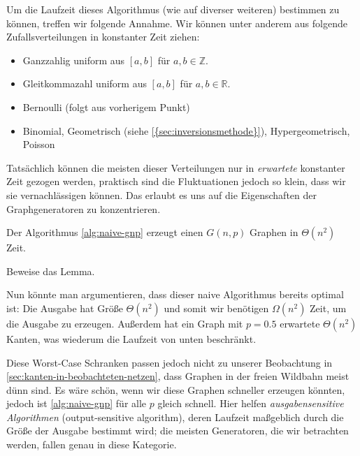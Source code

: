 Um  die Laufzeit dieses Algorithmus (wie auf diverser weiteren) bestimmen zu können, treffen wir folgende Annahme.
Wir können unter anderem aus folgende Zufallsverteilungen in konstanter Zeit ziehen:
\begin{itemize}
    \item Ganzzahlig uniform aus $[a, b]$ für $a, b \in \mathbb{Z}$.
    \item Gleitkommazahl uniform aus $[a, b]$ für $a, b \in \mathbb{R}$.
    \item Bernoulli (folgt aus vorherigem Punkt)
    \item Binomial, Geometrisch (siehe \cref{{sec:inversionsmethode}}), Hypergeometrisch, Poisson
\end{itemize}

Tatsächlich können die meisten dieser Verteilungen nur in \emph{erwartete} konstanter Zeit gezogen werden, praktisch sind die Fluktuationen jedoch so klein, dass wir sie vernachlässigen können.
Das erlaubt es uns auf die Eigenschaften der Graphgeneratoren zu konzentrieren.

\begin{lemma}
    \label{lem:naive-gnp}
    Der Algorithmus \ref{alg:naive-gnp} erzeugt einen $G(n, p)$ Graphen in $\Theta(n^2)$ Zeit.
\end{lemma}

\begin{exercise}
    Beweise das Lemma.
\end{exercise}

Nun könnte man argumentieren, dass dieser naive Algorithmus bereits optimal ist:
Die Ausgabe hat Größe $\Theta(n^2)$ und somit wir benötigen $\Omega(n^2)$ Zeit, um die Ausgabe zu erzeugen.
Außerdem hat ein Graph mit $p=0.5$ erwartete $\Theta(n^2)$ Kanten, was wiederum die Laufzeit von unten beschränkt.

Diese Worst-Case Schranken passen jedoch nicht zu unserer Beobachtung in \cref{sec:kanten-in-beobachteten-netzen}, dass Graphen in der freien Wildbahn meist dünn sind.
Es wäre schön, wenn wir diese Graphen schneller erzeugen könnten, jedoch ist \cref{alg:naive-gnp} für alle $p$ gleich \glqq schnell\grqq.
Hier  helfen \emph{ausgabensensitive Algorithmen} (output-sensitive algorithm), deren Laufzeit maßgeblich durch die Größe der Ausgabe bestimmt wird;
die meisten Generatoren, die wir betrachten werden, fallen genau in diese Kategorie.

